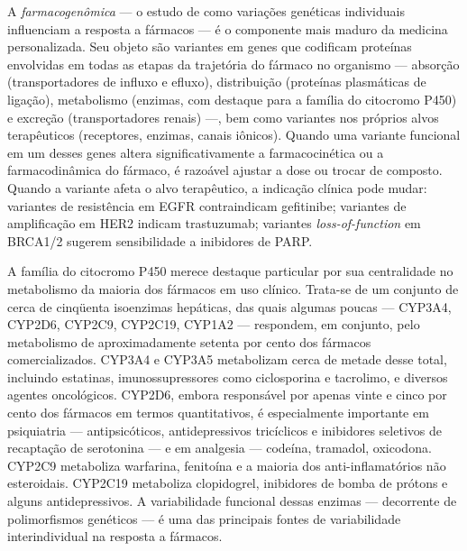 A \emph{farmacogenômica} --- o estudo de como variações genéticas individuais influenciam a resposta a fármacos --- é o componente mais maduro da medicina personalizada. Seu objeto são variantes em genes que codificam proteínas envolvidas em todas as etapas da trajetória do fármaco no organismo --- absorção (transportadores de influxo e efluxo), distribuição (proteínas plasmáticas de ligação), metabolismo (enzimas, com destaque para a família do citocromo P450) e excreção (transportadores renais) ---, bem como variantes nos próprios alvos terapêuticos (receptores, enzimas, canais iônicos). Quando uma variante funcional em um desses genes altera significativamente a farmacocinética ou a farmacodinâmica do fármaco, é razoável ajustar a dose ou trocar de composto. Quando a variante afeta o alvo terapêutico, a indicação clínica pode mudar: variantes de resistência em EGFR contraindicam gefitinibe; variantes de amplificação em HER2 indicam trastuzumab; variantes \emph{loss-of-function} em BRCA1/2 sugerem sensibilidade a inibidores de PARP.

A família do citocromo P450 merece destaque particular por sua centralidade no metabolismo da maioria dos fármacos em uso clínico. Trata-se de um conjunto de cerca de cinqüenta isoenzimas hepáticas, das quais algumas poucas --- CYP3A4, CYP2D6, CYP2C9, CYP2C19, CYP1A2 --- respondem, em conjunto, pelo metabolismo de aproximadamente setenta por cento dos fármacos comercializados. CYP3A4 e CYP3A5 metabolizam cerca de metade desse total, incluindo estatinas, imunossupressores como ciclosporina e tacrolimo, e diversos agentes oncológicos. CYP2D6, embora responsável por apenas vinte e cinco por cento dos fármacos em termos quantitativos, é especialmente importante em psiquiatria --- antipsicóticos, antidepressivos tricíclicos e inibidores seletivos de recaptação de serotonina --- e em analgesia --- codeína, tramadol, oxicodona. CYP2C9 metaboliza warfarina, fenitoína e a maioria dos anti-inflamatórios não esteroidais. CYP2C19 metaboliza clopidogrel, inibidores de bomba de prótons e alguns antidepressivos. A variabilidade funcional dessas enzimas --- decorrente de polimorfismos genéticos --- é uma das principais fontes de variabilidade interindividual na resposta a fármacos.

